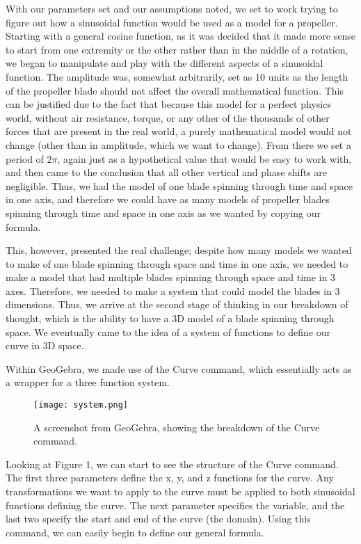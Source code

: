 With our parameters set and our assumptions noted, we set to work trying to figure out how a sinusoidal function would be used as a model for a propeller. Starting with a general cosine function, as it was decided that it made more sense to start from one extremity or the other rather than in the middle of a rotation, we began to manipulate and play with the different aspects of a sinusoidal function. The amplitude was, somewhat arbitrarily, set as 10 units as the length of the propeller blade should not affect the overall mathematical function. This can be justified due to the fact that because this model for a perfect physics world, without air resistance, torque, or any other of the thousands of other forces that are present in the real world, a purely mathematical model would not change (other than in amplitude, which we want to change). From there we set a period of \(2\pi\), again just as a hypothetical value that would be easy to work with, and then came to the conclusion that all other vertical and phase shifts are negligible. Thus, we had the model of one blade spinning through time and space in one axis, and therefore we could have as many models of propeller blades spinning through time and space in one axis as we wanted by copying our formula. 

This, however, presented the real challenge; despite how many models we wanted to make of one blade spinning through space and time in one axis, we needed to make a model that had multiple blades spinning through space and time in 3 axes. Therefore, we needed to make a system that could model the blades in 3 dimensions. Thus, we arrive at the second stage of thinking in our breakdown of thought, which is the ability to have a 3D model of a blade spinning through space. We eventually came to the idea of a system of functions to define our curve in 3D space.

Within GeoGebra, we made use of the Curve command, which essentially acts as a wrapper for a three function system.
\renewcommand{\thefigure}{1}
\begin{figure}[ht]
\texttt{[image: system.png]}
\caption{A screenshot from GeoGebra, showing the breakdown of the Curve command.}
\label{fig:system}
\end{figure}

Looking at Figure 1, we can start to see the structure of the Curve command. The first three parameters define the x, y, and z functions for the curve. Any transformations we want to apply to the curve must be applied to both sinusoidal functions defining the curve. The next parameter specifies the variable, and the last two specify the start and end of the curve (the domain). Using this command, we can easily begin to define our general formula.

